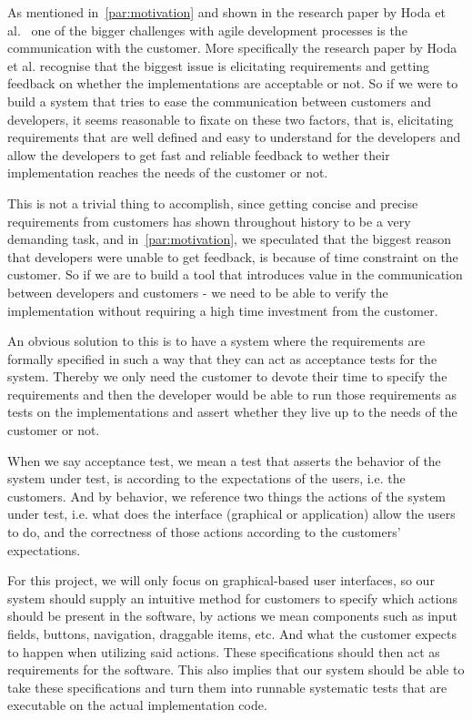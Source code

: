 As mentioned in~\autoref{par:motivation} and shown in the research paper by Hoda et al.~\cite{Hoda2011TheIO} one of the bigger challenges with agile development processes is the communication with the customer.
More specifically the research paper by Hoda et al. recognise that the biggest issue is elicitating requirements and getting feedback on whether the implementations are acceptable or not.
So if we were to build a system that tries to ease the communication between customers and developers, it seems reasonable to fixate on these two factors, that is, elicitating requirements that are well defined and easy to understand for the developers and allow the developers to get fast and reliable feedback to wether their implementation reaches the needs of the customer or not.

This is not a trivial thing to accomplish, since getting concise and precise requirements from customers has shown throughout history to be a very demanding task, and in~\autoref{par:motivation}, we speculated that the biggest reason that developers were unable to get feedback, is because of time constraint on the customer.
So if we are to build a tool that introduces value in the communication between developers and customers - we need to be able to verify the implementation without requiring a high time investment from the customer.

An obvious solution to this is to have a system where the requirements are formally specified in such a way that they can act as acceptance tests for the system.
Thereby we only need the customer to devote their time to specify the requirements and then the developer would be able to run those requirements as tests on the implementations and assert whether they live up to the needs of the customer or not.

When we say acceptance test, we mean a test that asserts the behavior of the system under test, is according to the expectations of the users, i.e. the customers.
And by behavior, we reference two things the actions of the system under test, i.e. what does the interface (graphical or application) allow the users to do, and the correctness of those actions according to the customers' expectations.

For this project, we will only focus on graphical-based user interfaces, so our system should supply an intuitive method for customers to specify which actions should be present in the software, by actions we mean components such as input fields, buttons, navigation, draggable items, etc.
And what the customer expects to happen when utilizing said actions.
These specifications should then act as requirements for the software.
This also implies that our system should be able to take these specifications and turn them into runnable systematic tests that are executable on the actual implementation code.


